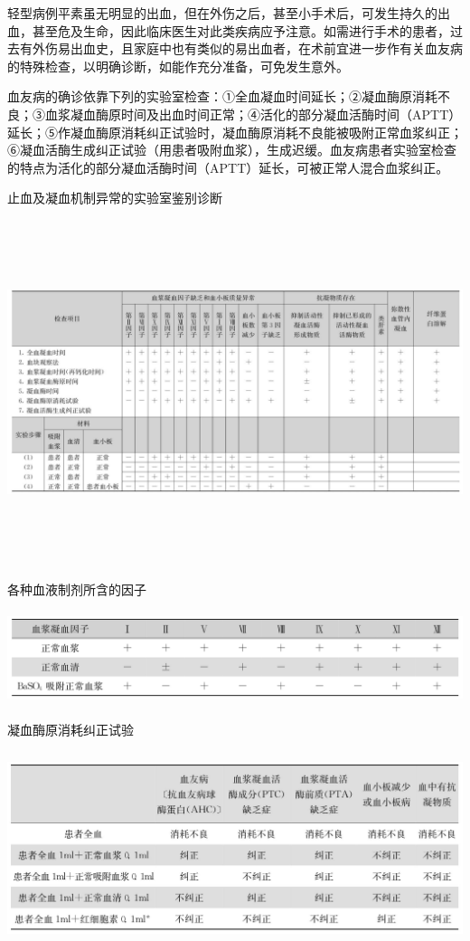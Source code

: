 轻型病例平素虽无明显的出血，但在外伤之后，甚至小手术后，可发生持久的出血，甚至危及生命，因此临床医生对此类疾病应予注意。如需进行手术的患者，过去有外伤易出血史，且家庭中也有类似的易出血者，在术前宜进一步作有关血友病的特殊检查，以明确诊断，如能作充分准备，可免发生意外。

血友病的确诊依靠下列的实验室检查：①全血凝血时间延长；②凝血酶原消耗不良；③血浆凝血酶原时间及出血时间正常；④活化的部分凝血活酶时间（APTT）延长；⑤作凝血酶原消耗纠正试验时，凝血酶原消耗不良能被吸附正常血浆纠正；⑥凝血活酶生成纠正试验（用患者吸附血浆），生成迟缓。血友病患者实验室检查的特点为活化的部分凝血活酶时间（APTT）延长，可被正常人混合血浆纠正。

\begin{table}[htbp]
\centering
\caption{止血及凝血机制异常的实验室鉴别诊断}
\label{tab34-6}
\includegraphics[width=8.80208in,height=3.95833in]{./images/Image00201.jpg}
\end{table}

\begin{table}[htbp]
\centering
\caption{各种血液制剂所含的因子}
\label{tab34-7}
\includegraphics[width=5.9375in,height=1.07292in]{./images/Image00202.jpg}
\end{table}

\begin{table}[htbp]
\centering
\caption{凝血酶原消耗纠正试验}
\label{tab34-8}
\includegraphics[width=5.91667in,height=2.21875in]{./images/Image00203.jpg}
\end{table}

